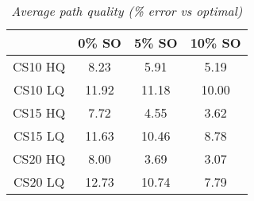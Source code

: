 \begin{table}[ht]
\begin{center}
\caption{\small{\emph{Average path quality (\% error vs optimal)}}}
\label{aha-table:pathquality}
\begin{tabular*}{0.4\textwidth}{@{\extracolsep{\fill}}cccc}%
  \hline
 & \small{0\% SO} & \small{5\% SO} & \small{10\% SO} \\
  \hline
 \small{CS10 HQ} & \small{8.23} & \small{5.91} & \small{5.19} \\
 \small{CS10 LQ} & \small{11.92} & \small{11.18} & \small{10.00} \\
 \small{CS15 HQ} & \small{7.72} & \small{4.55} & \small{3.62} \\
 \small{CS15 LQ} & \small{11.63} & \small{10.46} & \small{8.78} \\
 \small{CS20 HQ} & \small{8.00} & \small{3.69} & \small{3.07} \\
 \small{CS20 LQ} & \small{12.73} & \small{10.74} & \small{7.79} \\
   \hline
\end{tabular*}
\end{center}
\end{table}
